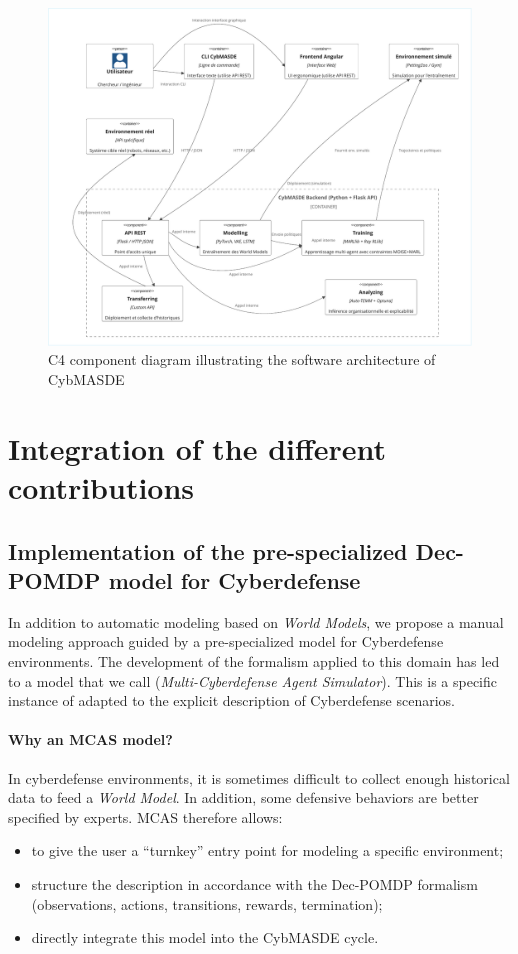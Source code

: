 \begin{figure}[H]
\centering
\includegraphics[width=\textwidth]{figures/CybMASDE_internal_component_diagram.pdf}
\caption{C4 component diagram illustrating the software architecture of CybMASDE}
\label{fig:cybmasde_uml}
\end {figure}

\section{Integration of the different contributions}

\subsection{Implementation of the pre-specialized Dec-POMDP model for Cyberdefense}

In addition to automatic modeling based on \textit{World Models}, we propose a manual modeling approach guided by a pre-specialized model for Cyberdefense environments.
The development of the  formalism applied to this domain has led to a model that we call  (\textit{Multi-Cyberdefense Agent Simulator}). This is a specific instance of  adapted to the explicit description of Cyberdefense scenarios.

\paragraph {Why an MCAS model?}
In cyberdefense environments, it is sometimes difficult to collect enough historical data to feed a \textit{World Model}. In addition, some defensive behaviors are better specified by experts. MCAS therefore allows:
\begin{itemize}
  \item to give the user a “turnkey” entry point for modeling a specific environment;
  \item structure the description in accordance with the Dec-POMDP formalism (observations, actions, transitions, rewards, termination);
  \item directly integrate this model into the CybMASDE cycle.
\end{itemize}

